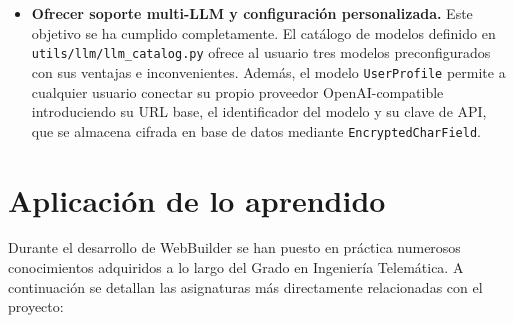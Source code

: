 \begin{itemize}
  \item \textbf{Ofrecer soporte multi-LLM y configuración personalizada.} Este objetivo se ha cumplido completamente. El catálogo de modelos definido en \texttt{utils/llm/llm\_catalog.py} ofrece al usuario tres modelos preconfigurados con sus ventajas e inconvenientes. Además, el modelo \texttt{UserProfile} permite a cualquier usuario conectar su propio proveedor OpenAI-compatible introduciendo su URL base, el identificador del modelo y su clave de API, que se almacena cifrada en base de datos mediante \texttt{EncryptedCharField}.
\end{itemize}


\section{Aplicación de lo aprendido}
\label{sec:aplicacion}

Durante el desarrollo de WebBuilder se han puesto en práctica numerosos conocimientos adquiridos a lo largo del Grado en Ingeniería Telemática. A continuación se detallan las asignaturas más directamente relacionadas con el proyecto:

